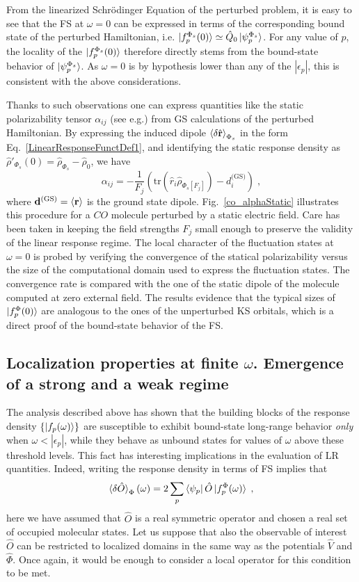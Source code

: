 \documentclass[reprint,aps,prb]{revtex4-1}
\newcommand{\eps}{\epsilon}
\newcommand{\be}{\begin{equation}}
\newcommand{\ee}{\end{equation}}
\newcommand{\lb}{\label}
\newcommand{\op}[1]{\hat {#1}}
\newcommand{\trace}[1]{\mathrm{tr}\left(#1\right)}
\newcommand{\dmnot}{\op{\rho}_0}
\newcommand{\dm}{\op{\rho}}
\begin{document}
From the linearized Schr\"odinger Equation of the perturbed problem, it is easy to see that the FS at $\omega=0$ can be expressed
in terms of the corresponding bound state of the perturbed Hamiltonian, i.e.
$\ket{f_p^{\Phi_s}(0)} \simeq \op Q_0 \ket{\psi_p^{\Phi_s}}$.
For any value of $p$, the locality of the $\ket{f_p^{\Phi_s}(0)}$ therefore directly stems from the
bound-state behavior of $\ket{\psi_p^{\Phi_s}}$. As $\omega=0$ is by hypothesis
lower than any of the $|\eps_p|$, this is consistent with the above considerations.

Thanks to such observations one can express quantities like the static polarizability tensor $\alpha_{ij}$ (see e.g.\cite{DebElecField}) from GS calculations of the perturbed Hamiltonian.
By expressing the induced dipole $\braket{\delta \op{\mathbf r}}_{\Phi_s}$ in the form Eq.~\eqref{LinearResponseFunctDef1}, and identifying the static response density as $\dm'_{\Phi_s}(0) = \dm_{\Phi_s} -\dmnot $, we have
\be \label{staticalpha}
\alpha_{ij} =
-\frac{1}{F_j} \left(\trace{\op r_i \dm_{\Phi_s[F_j]}} - d^{\text{(GS)}}_i \right)\;,
\ee
where $\mathbf d^\text{(GS)}=\braket{\mathbf r}$ is the ground state dipole.
Fig.~\eqref{co_alphaStatic} illustrates this procedure for a $CO$ molecule
perturbed by a static electric field.
Care has been taken in keeping the field strengths $F_j$ small enough to
preserve the validity of the linear response regime.
The local character of the fluctuation states at $\omega=0$ is
probed by verifying the convergence of the statical polarizability versus
the size of the computational domain used to express the fluctuation states. The convergence rate is compared with the
one of the static dipole of the molecule computed at zero external field.
The results evidence that the typical sizes of $\ket{f^\Phi_p(0)}$ are analogous to the ones of the unperturbed KS orbitals, which is a direct proof of the bound-state behavior of the FS.

\subsection{Localization properties at finite $\omega$. Emergence of a strong and a weak regime}

The analysis described above has shown that the building blocks of the response density $\{\ket{f_p(\omega)}\}$
are susceptible to exhibit bound-state long-range behavior \emph{only} when $\omega < |\eps_p|$,
while they behave as unbound states for values of $\omega$ above these threshold levels.
This fact has interesting implications in the evaluation of LR quantities. Indeed, writing the response
density in terms of FS implies that
\be\lb{LinearResponseFunctDef2}
\braket{\delta\op O}_\Phi(\omega) = 2 \sum_p\bra{\psi_p}\op O\ket{f_p^\Phi(\omega)}  \;,
\ee
here we have assumed that $\op O$ is a real symmetric operator and chosen a real set of occupied molecular states.
Let us suppose that also the observable of interest $\op O$ can be restricted to localized domains in the same way as the potentials $ \op V$ and $\op \Phi$.
Once again, it would be enough to consider a local operator for this condition to be met.
\end{document}
